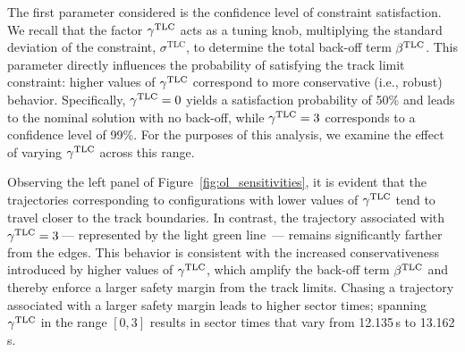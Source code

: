 The first parameter considered is the confidence level of constraint satisfaction.
We recall that the factor $\gamma^\textrm{TLC}$ acts as a tuning knob, multiplying the standard deviation of the constraint, $\sigma^\textrm{TLC}$, to determine the total back-off term $\beta^\textrm{TLC}$.
This parameter directly influences the probability of satisfying the track limit constraint: higher values of $\gamma^\textrm{TLC}$ correspond to more conservative (i.e., robust) behavior.
Specifically, $\gamma^\textrm{TLC} = 0$ yields a satisfaction probability of 50\% and leads to the nominal solution with no back-off, while $\gamma^\textrm{TLC} = 3$ corresponds to a confidence level of 99\%.
For the purposes of this analysis, we examine the effect of varying $\gamma^\textrm{TLC}$ across this range.


Observing the left panel of Figure~\ref{fig:ol_sensitivities}, it is evident that the trajectories corresponding to configurations with lower values of $\gamma^\textrm{TLC}$ tend to travel closer to the track boundaries. In contrast, the trajectory associated with $\gamma^\textrm{TLC} = 3$\,--- represented by the light green line \,--- remains significantly farther from the edges.
This behavior is consistent with the increased conservativeness introduced by higher values of $\gamma^\textrm{TLC}$, which amplify the back-off term $\beta^\textrm{TLC}$ and thereby enforce a larger safety margin from the track limits.
Chasing a trajectory associated with a larger safety margin leads to higher sector times; spanning $\gamma^\textrm{TLC}$ in the range $\left[0,3\right]$ results in sector times that vary from 12.135\,s to 13.162\,s.

